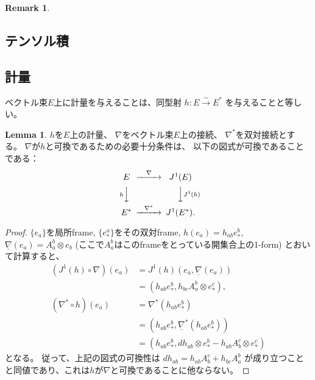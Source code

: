 \documentclass[uplatex]{jsarticle}
\theoremstyle{definition}
\newtheorem{lem}[lem]{Lemma}
\newtheorem{rem}[rem]{Remark}
\begin{document}
\begin{rem}
  
\end{rem}





\subsection{テンソル積}




\subsection{計量}


ベクトル束\(E\)上に計量を与えることは、同型射
\(h:E\xrightarrow{\sim}E^*\)
を与えることと等しい。

\begin{lem}\label{lem: met comm}
  \(h\)を\(E\)上の計量、
  \(\nabla\)をベクトル束\(E\)上の接続、
  \(\nabla^*\)を双対接続とする。
  \(\nabla\)が\(h\)と可換であるための必要十分条件は、
  以下の図式が可換であることである：
  \[
  \begin{CD}
    E @>{\nabla}>> J^1(E) \\
    @V{h}VV @VV{J^1(h)}V \\
    E^* @>{\nabla^*}>> J^1(E^*).
  \end{CD}
  \]
\end{lem}

\begin{proof}
  \(\{e_a\}\)を局所frame,
  \(\{e_*^a\}\)をその双対frame,
  \(h(e_a) = h_{ab}e_*^b\),
  \(\underline{\nabla}(e_a) = A_a^b\otimes e_b\)
  (ここで\(A_a^b\)はこのframeをとっている開集合上の1-form)
  とおいて計算すると、
  \begin{align*}
    (J^1(h)\circ \nabla) (e_a) &= J^1(h)(e_a,\underline{\nabla}(e_a)) \\
    &= (h_{ab}e_*^b, h_{bc}A_a^b\otimes e_*^c), \\
    (\nabla^*\circ h) (e_a) &= \nabla^*(h_{ab}e_*^b) \\
    &= (h_{ab}e_*^b, \underline{\nabla}^*(h_{ab}e_*^b)) \\
    &= (h_{ab}e_*^b, dh_{ab}\otimes e_*^b - h_{ab}A_b^c \otimes e_*^c)
  \end{align*}
  となる。
  従って、上記の図式の可換性は
  \(dh_{ab} = h_{ab}A_b^c + h_{bc}A_a^b\)
  が成り立つことと同値であり、これは\(h\)が\(\nabla\)と可換であることに他ならない。
\end{proof}
\end{document}
